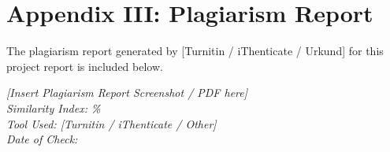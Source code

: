 
\newpage
\chapter*{Appendix III: Plagiarism Report}

\justify
The plagiarism report generated by [Turnitin / iThenticate / Urkund] for this project report is included below.

\vspace{1cm}

% 


\begin{mdframed}
    \centering
    \vspace{3cm}
    \textit{[Insert Plagiarism Report Screenshot / PDF here]}\\[0.5cm]
    \textit{Similarity Index: \underline{\hspace{2cm}}\%}\\[0.3cm]
    \textit{Tool Used: [Turnitin / iThenticate / Other]}\\[0.3cm]
    \textit{Date of Check: \underline{\hspace{4cm}}}
    \vspace{3cm}
\end{mdframed}
